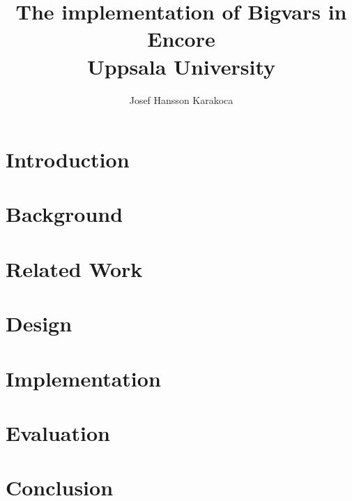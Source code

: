 \documentclass[12]{report}
\title{
    {The implementation of Bigvars in Encore}\\
    {Uppsala University}
    }
\author{Josef Hansson Karakoca }
\begin{document}
\maketitle



\tableofcontents

\chapter{Introduction}


\chapter{Background}


\chapter{Related Work}


\chapter{Design}


\chapter{Implementation}


\chapter{Evaluation}


\chapter{Conclusion}


%




\end{document}
